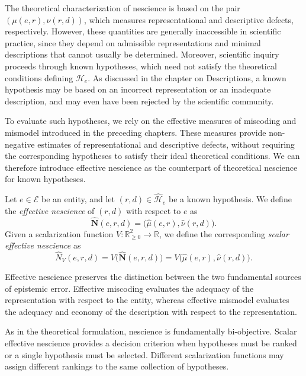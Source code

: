 The theoretical characterization of nescience is based on the pair $(\mu(e,r),\nu(r,d))$, which measures representational and descriptive defects, respectively. However, these quantities are generally inaccessible in scientific practice, since they depend on admissible representations and minimal descriptions that cannot usually be determined. Moreover, scientific inquiry proceeds through known hypotheses, which need not satisfy the theoretical conditions defining $\mathcal H_e$. As discussed in the chapter on Descriptions, a known hypothesis may be based on an incorrect representation or an inadequate description, and may even have been rejected by the scientific community.

To evaluate such hypotheses, we rely on the effective measures of miscoding and mismodel introduced in the preceding chapters. These measures provide non-negative estimates of representational and descriptive defects, without requiring the corresponding hypotheses to satisfy their ideal theoretical conditions. We can therefore introduce effective nescience as the counterpart of theoretical nescience for known hypotheses.

\begin{definition}
Let $e\in\mathcal E$ be an entity, and let $(r,d)\in\widehat{\mathcal H}_e$ be a known hypothesis. We define the \emph{effective nescience}  of $(r,d)$ with respect to $e$ as
\[
\widehat{\mathbf N}(e,r,d) = \bigl(\widehat\mu(e,r), \widehat\nu(r,d)\bigr).
\]
Given a scalarization function $V:\mathbb R_{\geq0}^2\to\mathbb R$, we define the corresponding \emph{scalar effective nescience}  as
\[
\widehat N_V(e,r,d) = V\bigl(\widehat{\mathbf N}(e,r,d)\bigr) = V\bigl(\widehat\mu(e,r),\widehat\nu(r,d)\bigr).
\]
\end{definition}

Effective nescience preserves the distinction between the two fundamental sources of epistemic error. Effective miscoding evaluates the adequacy of the representation with respect to the entity, whereas effective mismodel evaluates the adequacy and economy of the description with respect to the representation.

As in the theoretical formulation, nescience is fundamentally bi-objective. Scalar effective nescience provides a decision criterion when hypotheses must be ranked or a single hypothesis must be selected. Different scalarization functions may assign different rankings to the same collection of hypotheses.

